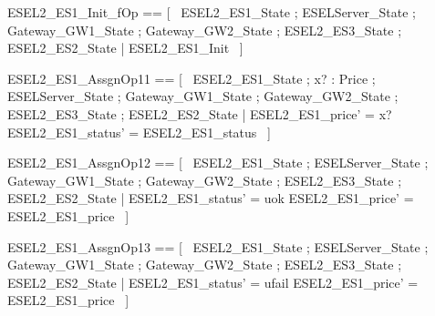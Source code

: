 \documentclass{article}
\begin{document}
\begin{zed}
	ESEL2\_ES1\_Init\_fOp == [~  \Xi ESEL2\_ES1\_State ; \Xi ESELServer\_State ; \Xi Gateway\_GW1\_State ; \Xi Gateway\_GW2\_State ; \Xi ESEL2\_ES3\_State ; \Xi ESEL2\_ES2\_State | \lnot \pre ESEL2\_ES1\_Init  ~]
\end{zed}

\begin{zed}
	ESEL2\_ES1\_AssgnOp11 == [~  \Delta ESEL2\_ES1\_State ; x? : Price ; \Xi ESELServer\_State ; \Xi Gateway\_GW1\_State ; \Xi Gateway\_GW2\_State ; \Xi ESEL2\_ES3\_State ; \Xi ESEL2\_ES2\_State | ESEL2\_ES1\_price' = x? \land ESEL2\_ES1\_status' = ESEL2\_ES1\_status  ~]
\end{zed}

\begin{zed}
	ESEL2\_ES1\_AssgnOp12 == [~  \Delta ESEL2\_ES1\_State ; \Xi ESELServer\_State ; \Xi Gateway\_GW1\_State ; \Xi Gateway\_GW2\_State ; \Xi ESEL2\_ES3\_State ; \Xi ESEL2\_ES2\_State | ESEL2\_ES1\_status' = uok \land ESEL2\_ES1\_price' = ESEL2\_ES1\_price  ~]
\end{zed}

\begin{zed}
	ESEL2\_ES1\_AssgnOp13 == [~  \Delta ESEL2\_ES1\_State ; \Xi ESELServer\_State ; \Xi Gateway\_GW1\_State ; \Xi Gateway\_GW2\_State ; \Xi ESEL2\_ES3\_State ; \Xi ESEL2\_ES2\_State | ESEL2\_ES1\_status' = ufail \land ESEL2\_ES1\_price' = ESEL2\_ES1\_price  ~]
\end{zed}
\end{document}
